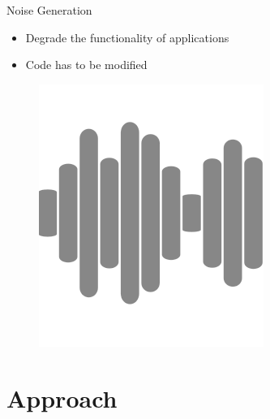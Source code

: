 \documentclass[aspectratio=169]{beamer}
[aspectratio=169] %
\begin{document}
\begin{frame}{Noise Generation}
  \begin{minipage}{0.49\textwidth} 
    \begin{itemize}
      \item Degrade the functionality of applications
      \item Code has to be modified
    \end{itemize}
  \end{minipage}
  \hfill
  \begin{minipage}{0.49\textwidth} 
    \begin{figure}
      \centering
      \includegraphics[height=0.5\textheight]{figures/noise.png}
    \end{figure}
  \end{minipage}
\end{frame}


\section{Approach}
\end{document}
